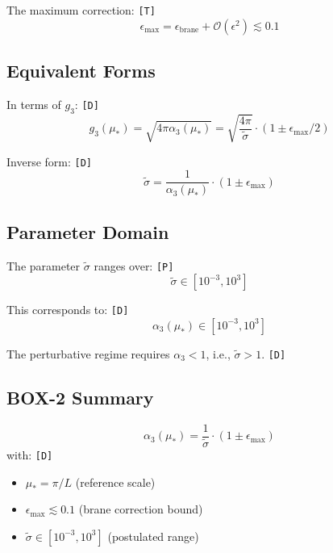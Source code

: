 \documentclass[11pt,a4paper]{article}
\newcommand{\tagD}{\textcolor{green!50!black}{\texttt{[D]}}}
\newcommand{\tagP}{\textcolor{orange!80!black}{\texttt{[P]}}}
\newcommand{\tagT}{\textcolor{cyan!70!black}{\texttt{[T]}}}
\theoremstyle{definition}
\begin{document}
The maximum correction: \tagT{}
\begin{equation}
\label{eq:epsilon-max-def}
\epsilon_{\max} = \epsilon_{\text{brane}} + \mathcal{O}(\epsilon^2) \lesssim 0.1
\end{equation}

\subsection{Equivalent Forms}
\label{subsec:equivalent-forms}

In terms of $g_3$: \tagD{}
\begin{equation}
\label{eq:g3-from-sigma}
g_3(\mu_*) = \sqrt{4\pi \alpha_3(\mu_*)} = \sqrt{\frac{4\pi}{\tilde{\sigma}}} \cdot (1 \pm \epsilon_{\max}/2)
\end{equation}

Inverse form: \tagD{}
\begin{equation}
\label{eq:sigma-from-alpha}
\tilde{\sigma} = \frac{1}{\alpha_3(\mu_*)} \cdot (1 \pm \epsilon_{\max})
\end{equation}

\subsection{Parameter Domain}
\label{subsec:param-domain}

The parameter $\tilde{\sigma}$ ranges over: \tagP{}
\begin{equation}
\label{eq:sigma-domain}
\tilde{\sigma} \in [10^{-3}, 10^3]
\end{equation}

This corresponds to: \tagD{}
\begin{equation}
\label{eq:alpha3-domain}
\alpha_3(\mu_*) \in [10^{-3}, 10^3]
\end{equation}

The perturbative regime requires $\alpha_3 < 1$, i.e., $\tilde{\sigma} > 1$. \tagD{}

\subsection{BOX-2 Summary}
\label{subsec:box2-summary}

\begin{derivbox}
\begin{equation}
\label{eq:box2-canonical}
\boxed{\alpha_3(\mu_*) = \frac{1}{\tilde{\sigma}} \cdot (1 \pm \epsilon_{\max})}
\end{equation}
with: \tagD{}
\begin{itemize}
  \item $\mu_* = \pi/L$ (reference scale)
  \item $\epsilon_{\max} \lesssim 0.1$ (brane correction bound)
  \item $\tilde{\sigma} \in [10^{-3}, 10^3]$ (postulated range)
\end{itemize}
\end{derivbox}
\end{document}
